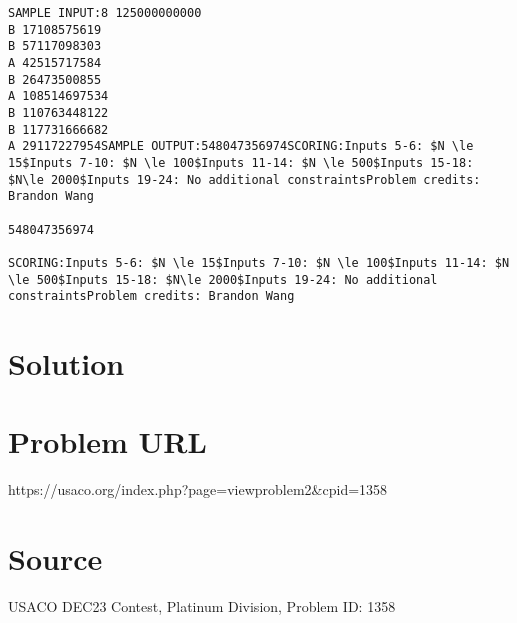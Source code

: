 \documentclass[12pt]{article}
\begin{document}
\begin{verbatim}
SAMPLE INPUT:8 125000000000
B 17108575619
B 57117098303
A 42515717584
B 26473500855
A 108514697534
B 110763448122
B 117731666682
A 29117227954SAMPLE OUTPUT:548047356974SCORING:Inputs 5-6: $N \le 15$Inputs 7-10: $N \le 100$Inputs 11-14: $N \le 500$Inputs 15-18: $N\le 2000$Inputs 19-24: No additional constraintsProblem credits: Brandon Wang

548047356974

SCORING:Inputs 5-6: $N \le 15$Inputs 7-10: $N \le 100$Inputs 11-14: $N \le 500$Inputs 15-18: $N\le 2000$Inputs 19-24: No additional constraintsProblem credits: Brandon Wang
\end{verbatim}

\section*{Solution}


\section*{Problem URL}
https://usaco.org/index.php?page=viewproblem2&cpid=1358

\section*{Source}
USACO DEC23 Contest, Platinum Division, Problem ID: 1358
\end{document}
